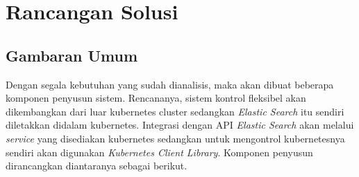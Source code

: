 \section{Rancangan Solusi}
\label{sec:rancangan-solusi}

\subsection{Gambaran Umum}
Dengan segala kebutuhan yang sudah dianalisis, maka akan dibuat beberapa komponen penyusun sistem. Rencananya, sistem kontrol fleksibel akan dikembangkan dari luar kubernetes cluster sedangkan \textit{Elastic Search} itu sendiri diletakkan didalam kubernetes. Integrasi dengan API \textit{Elastic Search} akan melalui \textit{service} yang disediakan kubernetes sedangkan untuk mengontrol kubernetesnya sendiri akan digunakan \textit{Kubernetes Client Library}. Komponen penyusun dirancangkan diantaranya sebagai berikut.


